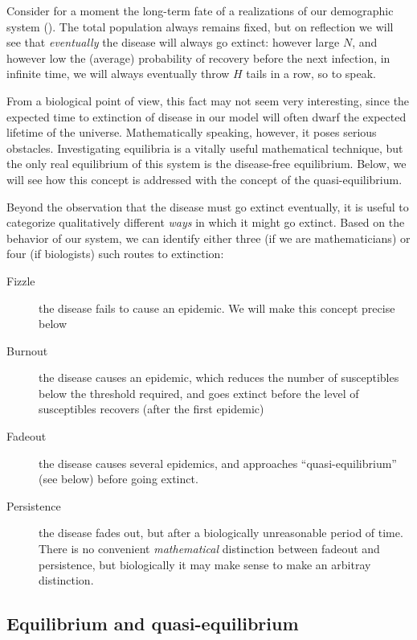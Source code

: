 \documentclass{amsproc}
\theoremstyle{definition}
\theoremstyle{remark}
\numberwithin{equation}{section}
\begin{document}
Consider for a moment the long-term fate of a realizations of our demographic system ().  The total population always remains fixed, but on reflection we will see that {\em eventually} the disease will always go extinct: however large $N$, and however low the (average) probability of recovery before the next infection, in infinite time, we will always eventually throw $H$ tails in a row, so to speak.  

From a biological point of view, this fact may not seem very interesting, since the expected time to extinction of disease in our model will often dwarf the expected lifetime of the universe.  Mathematically speaking, however, it poses serious obstacles.  Investigating equilibria is a vitally useful mathematical technique, but the only real equilibrium of this system is the disease-free equilibrium.  Below, we will see how this concept is addressed with the concept of the quasi-equilibrium.

Beyond the observation that the disease must go extinct eventually, it is useful to categorize qualitatively different {\em ways} in which it might go extinct.  Based on the behavior of our system, we can identify either three (if we are mathematicians) or four (if biologists) such routes to extinction:

\begin{description}

	\item [Fizzle] the disease fails to cause an epidemic.  We will make this concept precise below

	\item [Burnout] the disease causes an epidemic, which reduces the number of susceptibles below the threshold required, and goes extinct before the level of susceptibles recovers (after the first epidemic)

	\item [Fadeout] the disease causes several epidemics, and approaches ``quasi-equilibrium'' (see below) before going extinct.

	\item [Persistence] the disease fades out, but after a biologically unreasonable period of time.  
	There is no convenient {\em mathematical} distinction between fadeout and persistence, but biologically it may make sense to make an arbitray distinction.

\end{description}

\subsection{Equilibrium and quasi-equilibrium }
\end{document}
